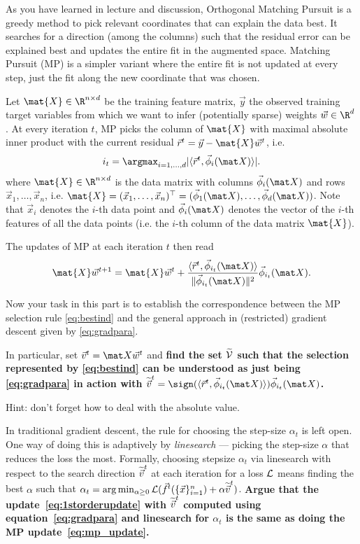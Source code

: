 \documentclass[preview]{standalone}
\begin{document}
\begin{Parts}
As you have learned in lecture and discussion, Orthogonal Matching
Pursuit is a greedy method to pick relevant coordinates that can 
explain the data best. It searches for a direction (among the columns)
such that the residual error can be explained best and updates the
entire fit in the augmented space. Matching Pursuit (MP) is a simpler variant
where the entire fit is not updated at every step, just the fit along
the new coordinate that was chosen.

Let $\mat{X} \in \R^{n\times d}$ be the training feature matrix, $\vec{y}$ the
observed training target variables from which we want to infer (potentially
sparse) weights $\vec{w} \in \R^d$.  At every iteration $t$, MP picks
the column of $\mat{X}$ with maximal absolute inner product with the
current residual $\res{t} = \vec{y} - \mat{X}\vec{w}^t$, i.e.
\begin{equation}
  \label{eq:bestind}
  \ind{t}
  = \argmax_{i=1,\dots,d}|\langle \res{t}, \Xcol{i}\rangle|.
\end{equation}
where $\mat{X} \in \R^{n\times d}$ is the data matrix with columns $\Xcol{i}$ and rows $\vec{x}_1,\dots, \vec{x}_n$, i.e. $\mat{X} = (\vec{x}_1, \dots, \vec{x}_n)^\top = (\Xcol{1},\dots, \Xcol{d})$.
Note that $\vec x_i$ denotes the $i$-th data point
and $\Xcol{i}$ denotes the vector of the $i$-th features of all the
data points (i.e. the $i$-th column of the data matrix $\mat{X}$).

The updates of MP at each iteration $t$ then read
\begin{equation}
\label{eq:mp_update}
  \mat{X}\vec{w}^{t+1} = \mat{X}\vec{w}^t 
  + \frac{\langle \res{t}, \Xcol{\ind{t}}\rangle}{\|\Xcol{\ind{t}}\|^2} \Xcol{\ind{t}}.
\end{equation}

Now your task in this part is to establish the correspondence between
the MP selection rule \eqref{eq:bestind} and the general approach in
(restricted) gradient descent given by \eqref{eq:gradpara}. 

In particular, set $\vec v^t = \mat X \vec w^t$ and {\bf find the
set $\widetilde{\mathcal{V}}$ such that the selection represented by
\eqref{eq:bestind} can be understood as just being \eqref{eq:gradpara}
in action with $\tilvecv^t = \sign(\langle \res{t}, \Xcol{\ind{t}}\rangle) \Xcol{\ind{t}}$.}

Hint: don't forget how to deal with the absolute value.




\Part In traditional gradient descent, the rule for choosing the
step-size $\alpha_t$ is left open. One way of doing this is adaptively
by \emph{linesearch} --- picking the step-size $\alpha$ that reduces the loss
the most. Formally, choosing stepsize $\alpha_t$ via linesearch with respect to the search direction $\widetilde{\vec{v}}^t$ at each iteration for a loss $\mathcal{L}$ means finding the best $\alpha$ such that  $\alpha_t = \arg \min_{\alpha \geq 0} \mathcal{L}(\vec{f}^t(\{\vec{x}\}_{i=1}^n) + \alpha \widetilde{\vec{v}}^t)$.
{\bf Argue that the update~\eqref{eq:1storderupdate} with
  $\widetilde{\vec{v}}^t$ computed using equation~\eqref{eq:gradpara} and
  linesearch for $\alpha_t$ is the same as doing the MP update~\eqref{eq:mp_update}. }


\end{Parts}
\end{document}
